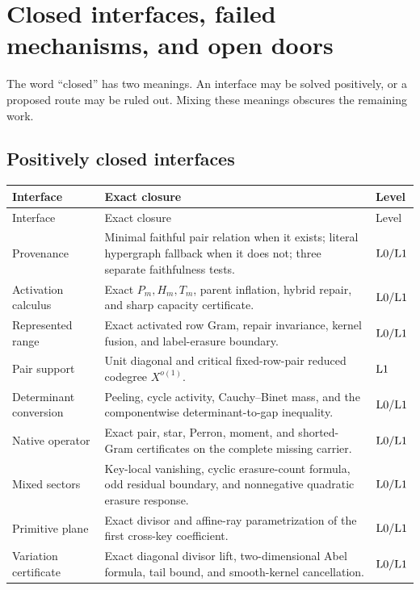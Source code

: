 \section{Closed interfaces, failed mechanisms, and open doors}
\label{sec:closed-open}

The word ``closed'' has two meanings.  An interface may be solved positively,
or a proposed route may be ruled out.  Mixing these meanings obscures the
remaining work.

\subsection{Positively closed interfaces}

\begin{longtable}{>{\raggedright\arraybackslash}p{}
                  >{\raggedright\arraybackslash}p{}
                  >{\raggedright\arraybackslash}p{}}
\toprule
Interface & Exact closure & Level\\
\midrule
\endfirsthead
\toprule
Interface & Exact closure & Level\\
\midrule
\endhead
Provenance
& Minimal faithful pair relation when it exists; literal hypergraph
  fallback when it does not; three separate faithfulness tests.
& \(\mathrm{L0}/\mathrm{L1}\)\\
\addlinespace
Activation calculus
& Exact \(P_m,H_m,T_m\), parent inflation, hybrid repair, and sharp capacity
  certificate.
& \(\mathrm{L0}/\mathrm{L1}\)\\
\addlinespace
Represented range
& Exact activated row Gram, repair invariance, kernel fusion, and
  label-erasure boundary.
& \(\mathrm{L0}/\mathrm{L1}\)\\
\addlinespace
Pair support
& Unit diagonal and critical fixed-row-pair reduced codegree
  \(X^{o(1)}\).
& \(\mathrm{L1}\)\\
\addlinespace
Determinant conversion
& Peeling, cycle activity, Cauchy--Binet mass, and the componentwise
  determinant-to-gap inequality.
& \(\mathrm{L0}/\mathrm{L1}\)\\
\addlinespace
Native operator
& Exact pair, star, Perron, moment, and shorted-Gram certificates on the
  complete missing carrier.
& \(\mathrm{L0}/\mathrm{L1}\)\\
\addlinespace
Mixed sectors
& Key-local vanishing, cyclic erasure-count formula, odd residual boundary,
  and nonnegative quadratic erasure response.
& \(\mathrm{L0}/\mathrm{L1}\)\\
\addlinespace
Primitive plane
& Exact divisor and affine-ray parametrization of the first cross-key
  coefficient.
& \(\mathrm{L0}/\mathrm{L1}\)\\
\addlinespace
Variation certificate
& Exact diagonal divisor lift, two-dimensional Abel formula, tail bound,
  and smooth-kernel cancellation.
& \(\mathrm{L0}/\mathrm{L1}\)\\
\bottomrule
\end{longtable}

